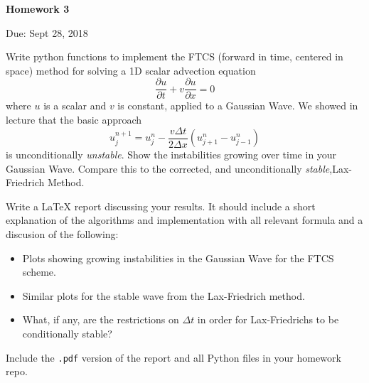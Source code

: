 \documentclass{article}
\begin{document}
\begin{center}

\vspace*{-2.5cm}
\LARGE
\bf{Homework 3}
\vspace{1cm}

\large{Due: Sept 28, 2018}
\vspace{1cm}

\end{center}

Write python functions to implement the FTCS (forward in time, centered in space) method for solving a 1D scalar advection equation
\begin{equation*}
   \frac{\partial u}{\partial t} + v \frac{\partial u}{\partial x} = 0
\end{equation*}
where $u$ is a scalar and $v$ is constant, applied to a Gaussian Wave. We showed in lecture that the basic approach
\begin{equation*}
   u_j^{n+1} = u^n_j - \frac{v \Delta t}{2\Delta x} \left( u^n_{j+1} - u^n_{j-1} \right) 
\end{equation*}
is unconditionally \emph{unstable}.  Show the instabilities growing over time in your Gaussian Wave.  Compare this to the corrected, and unconditionally \emph{stable},Lax-Friedrich Method.
\par
Write a \LaTeX{} report discussing your results.  It should include a short explanation of the algorithms and implementation with all relevant formula and a discusion of the following:
\begin{itemize}
   \item Plots showing growing instabilities in the Gaussian Wave for the FTCS scheme.
   \item Similar plots for the stable wave from the Lax-Friedrich method.
   \item What, if any, are the restrictions on $\Delta t$ in order for Lax-Friedrichs to be conditionally stable?
\end{itemize}
Include the \texttt{.pdf} version of the report and all Python files in your homework repo.
\end{document}
